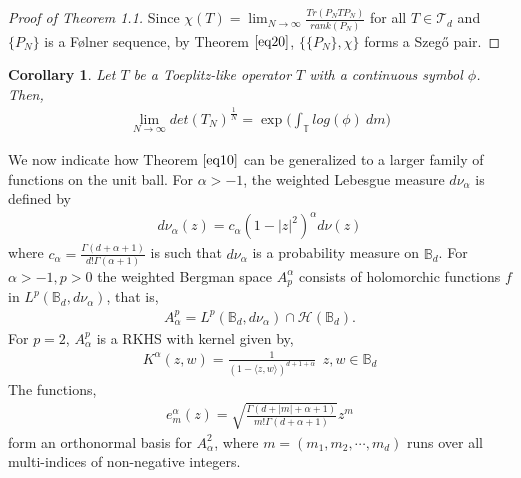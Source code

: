 \documentclass[article]{amsart}
\newtheorem{cor}[theorem]{Corollary}
\begin{document}

\begin{proof}[Proof of Theorem 1.1]
Since $\chi(T) = \lim_{N\rightarrow \infty} \frac{Tr(P_N T P_N)}{rank(P_N)}$ for all $T \in \mathcal{T}_d$ and $\{P_N\}$ is a Følner sequence, by Theorem $\ref{eq20}$, $\{\{P_N\}, \chi\}$ forms a Szeg\H{o} pair. 
\end{proof}
\begin{cor}
Let $T$ be a Toeplitz-like operator $T$ with a continuous symbol $\phi$. Then,
    \begin{align}\label{eq12}
    \lim_{N \rightarrow \infty} det(T_N)^{\frac{1}{N}} = \exp\Big( \int_{\mathbb{T}} log(\phi) \  dm \Big)
\end{align}
\end{cor}
We now indicate how Theorem $\ref{eq10}$ can be generalized to a larger family of functions on the unit ball.
    For $\alpha > -1$, the weighted Lebesgue measure $d \nu_{\alpha}$ is defined by
    \begin{align*}
        d \nu_{\alpha}(z) = c_{\alpha} (1-|z|^2)^{\alpha} d \nu(z)
    \end{align*}
    where $c_{\alpha} = \frac{\Gamma(d+\alpha+1)}{d! \Gamma(\alpha +1)}$ is such that $d\nu_{\alpha}$ is a probability measure on $\mathbb{B}_d$. For $\alpha > -1, p> 0$ the weighted Bergman space $A_p^{\alpha}$ consists of holomorchic functions $f$ in $L^p(\mathbb{B}_d, d \nu_{\alpha})$, that is,
    \begin{align*}
        A^p_{\alpha} = L^p(\mathbb{B}_d, d \nu_{\alpha}) \cap \mathcal{H}(\mathbb{B}_d).
    \end{align*}
    For $p=2$, $A^p_{\alpha}$ is a RKHS with kernel given by,
    \begin{align*}
        K^{\alpha}(z,w) = \frac{1}{(1-\langle z,w\rangle)^{d+1+\alpha}} \ \ z,w \in \mathbb{B}_d
    \end{align*}
    The functions,
    \begin{align*}
        e_m^{\alpha}(z) = \sqrt{\frac{\Gamma(d+|m|+\alpha+1)}{m! \Gamma(d+\alpha+1)}} z^m
    \end{align*}
    form an orthonormal basis for $A_{\alpha}^2$, where $m=(m_1,m_2,\cdots,m_d)$ runs over all multi-indices of non-negative integers.\\
\end{document}
